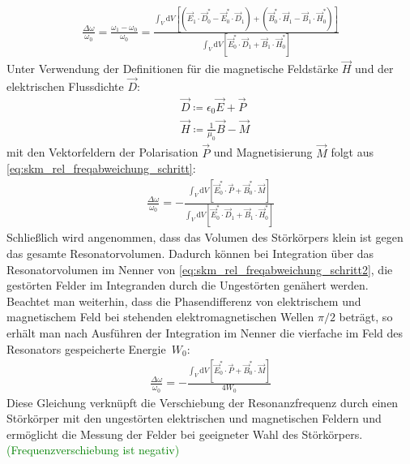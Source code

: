 \documentclass[11pt, a4paper]{scrbook}
\newcommand{\ve}{\vec{E}}
\newcommand{\vb}{\vec{B}}
\newcommand{\vh}{\vec{H}}
\newcommand{\vd}{\vec{D}}
\newcommand{\todo}[1]{{\textcolor{Green}{(#1)}}}
\begin{document}
	\begin{align}
		\frac{\Delta \omega}{\omega_0}= \frac{\omega_1 - \omega_0}{\omega_0} = \frac{\int_{V} \mathrm{d}V \left[ \left( \ve_1 \cdot \vd_0^* - \ve_0^* \cdot \vd_1 \right) + \left( \vb_0^* \cdot \vh_1 - \vb_1 \cdot \vh_0^* \right)\right]}{\int_V \mathrm{d}V \left[\ve_0^* \cdot \vd_1 + \vb_1 \cdot \vh_0^* \right] }
		\label{eq:skm_rel_freqabweichung_schritt}
	\end{align}
	Unter Verwendung der Definitionen für die magnetische Feldstärke $\vh$ und der elektrischen Flussdichte $\vd$:
	\begin{subequations}
		\begin{align}
			&\vd \coloneqq \epsilon_0 \ve + \vec{P}\\
			&\vh \coloneqq \frac{1}{\mu_0} \vb - \vec{M}
		\end{align}
	\end{subequations}
	mit den Vektorfeldern der Polarisation $\vec{P}$ und Magnetisierung $\vec{M}$ folgt aus \eqref{eq:skm_rel_freqabweichung_schritt}:
	\begin{align}
		\frac{\Delta \omega}{\omega_0} = - \frac{\int_V \mathrm{d}V \left[ \ve_0^* \cdot \vec{P} + \vb_0^* \cdot \vec{M} \right]}{\int_V \mathrm{d}V \left[ \ve_0^* \cdot \vd_1 + \vb_1 \cdot \vh_0^* \right]} \label{eq:skm_rel_freqabweichung_schritt2}
	\end{align}
	Schließlich wird angenommen, dass das Volumen des Störkörpers klein ist gegen das gesamte Resonatorvolumen.
	Dadurch können bei Integration über das Resonatorvolumen im Nenner von \eqref{eq:skm_rel_freqabweichung_schritt2}, die gestörten Felder im Integranden durch die Ungestörten genähert werden.
	Beachtet man weiterhin, dass die Phasendifferenz von elektrischem und magnetischem Feld bei stehenden elektromagnetischen Wellen $\pi / 2$ beträgt, so erhält man nach Ausführen der Integration im Nenner die vierfache im Feld des Resonators gespeicherte Energie~$W_0$:
	\begin{align}
		\frac{\Delta \omega}{\omega_0} = - \frac{\int_V \mathrm{d}V \left[ \ve_0^* \cdot \vec{P} + \vb_0^* \cdot \vec{M} \right]}{4 W_0}
	\end{align}
	Diese Gleichung verknüpft die Verschiebung der Resonanzfrequenz durch einen Störkörper mit den ungestörten elektrischen und magnetischen Feldern und ermöglicht die Messung der Felder bei geeigneter Wahl des Störkörpers.
	\todo{Frequenzverschiebung ist negativ}
		
	\backmatter
		
\end{document}
